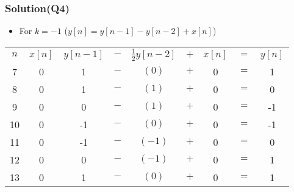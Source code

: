 \documentclass{beamer}
\begin{document}
\begin{frame}
\frametitle{Solution(Q4)}

\begin{itemize} \itemsep1pt \parskip0pt 
  \item[] For $k = -1$ ($y[n]=y[n-1]-y[n-2]+x[n]$)
\end{itemize}

\begin{table}
\def\arraystretch{1.5}
\begin{tabular}{ccccccccc}
\hline
$n$ & $x[n]$ & $y[n-1]$ & $-$ & $\frac{1}{2}y[n-2]$ & $+$ & $x[n]$ & $=$ & $y[n]$ \\

7 & 0 & 1 & $-$ & $(0)$ & $+$ & 0 & $=$ & 1 \\ 

8 & 0 & 1 & $-$ & $(1)$ & $+$ & 0 & $=$ & 0 \\ 

9 & 0 & 0 & $-$ & $(1)$ & $+$ & 0 & $=$ & -1 \\ 

10 & 0 & -1 & $-$ & $(0)$ & $+$ & 0 & $=$ & -1 \\ 

11 & 0 & -1 & $-$ & $(-1)$ & $+$ & 0 & $=$ & 0 \\

12 & 0 & 0 & $-$ & $(-1)$ & $+$ & 0 & $=$ & 1 \\ 

13 & 0 & 1 & $-$ & $(0)$ & $+$ & 0 & $=$ & 1 \\ 
\hline
\end{tabular}
\end{table}


\end{frame}

\end{document}
